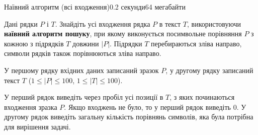 \begin{problem}{Наївний алгоритм (всі входження)}{}{}{0.2 секунди}{64 мегабайти}

Дані рядки $P$ і $T$. Знайдіть усі входження рядка $P$ в текст $T$, використовуючи {\bf наївний алгоритм пошуку}, 
при якому виконується посимвольне порівняння $P$ з кожною з підрядків $T$ довжини $|P|$.
Підрядки $T$ перебираються зліва направо, символи рядків також порівнюються зліва направо. 

\InputFile
У першому рядку вхідних даних записаний зразок $P$, 
у другому рядку записаний текст $T$ ($1 \le |P| \le 100$, $1 \le |T| \le 100$).


\OutputFile
У перший рядок виведіть через пробіл усі позиції в $T$, з яких починаються входження зразка $P$. 
Якщо входжень не було, то у перший рядок виведіть 0.
У другому рядок виведіть загальну кількість порівнянь символів, яка була потрібна для вирішення задачі. 

\Examples

\begin{example}
%
\end{example}

\end{problem}

